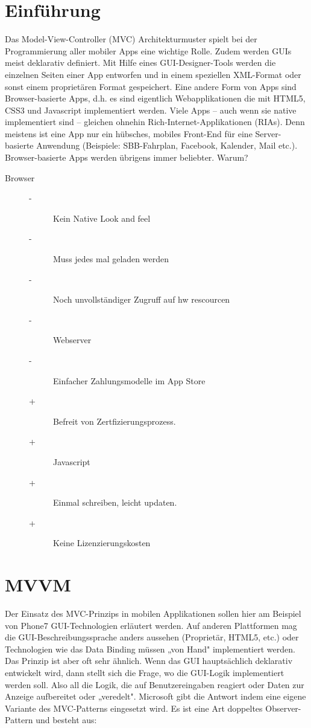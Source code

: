\documentclass[a4paper,10pt]{scrreprt}
\begin{document}
\section{Einführung}
Das Model-View-Controller (MVC) Architekturmuster spielt bei der Programmierung aller mobiler Apps eine
wichtige Rolle. Zudem werden GUIs meist deklarativ definiert. Mit Hilfe eines GUI-Designer-Tools werden die
einzelnen Seiten einer App entworfen und in einem speziellen XML-Format oder sonst einem proprietären
Format gespeichert. Eine andere Form von Apps sind Browser-basierte Apps, d.h. es sind eigentlich
Webapplikationen die mit HTML5, CSS3 und Javascript implementiert werden.
Viele Apps – auch wenn sie native implementiert sind – gleichen ohnehin Rich-Internet-Applikationen (RIAs).
Denn meistens ist eine App nur ein hübsches, mobiles Front-End für eine Server-basierte Anwendung (Beispiele:
SBB-Fahrplan, Facebook, Kalender, Mail etc.). Browser-basierte Apps werden übrigens immer beliebter.
Warum?


\begin{description}
 \item [Browser]
 \begin{description}
  \item[-] Kein Native Look and feel
  \item[-] Muss jedes mal geladen werden
  \item[-] Noch unvollständiger Zugruff auf hw rescourcen
  \item[-] Webserver
  \item[-] Einfacher Zahlungsmodelle im App Store
  \item[+] Befreit von Zertfizierungsprozess.
  \item[+] Javascript
  \item [+] Einmal schreiben, leicht updaten.
  \item[+] Keine Lizenzierungskosten
 \end{description}

\end{description}

\section{MVVM}
Der Einsatz des MVC-Prinzips in mobilen Applikationen sollen hier am Beispiel von Phone7 GUI-Technologien
erläutert werden. Auf anderen Plattformen mag die GUI-Beschreibungssprache anders aussehen (Proprietär,
HTML5, etc.) oder Technologien wie das Data Binding müssen „von Hand" implementiert werden. Das Prinzip ist
aber oft sehr ähnlich.
Wenn das GUI hauptsächlich deklarativ entwickelt wird, dann stellt sich die Frage, wo die GUI-Logik
implementiert werden soll. Also all die Logik, die auf Benutzereingaben reagiert oder Daten zur Anzeige
aufbereitet oder „veredelt". Microsoft gibt die Antwort indem eine eigene Variante des MVC-Patterns
eingesetzt wird. Es ist eine Art doppeltes Observer-Pattern und besteht aus:
\end{document}
